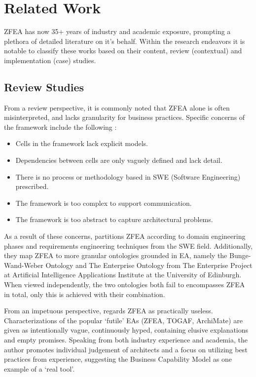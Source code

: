 \documentclass[12pt,conference]{IEEEtran}
\begin{document}
\section{Related Work}
ZFEA has now 35+ years of industry and academic exposure, prompting a plethora of detailed literature on it's behalf. 
Within the research endeavors it is notable to classify these works based on their content, review (contextual) and implementation (case) studies. 

\subsection{Review Studies}
From a review perspective, it is commonly noted that ZFEA alone is often misinterpreted, and lacks granularity for business practices. 
Specific concerns of the framework include the following \cite{rediscovering_zachman,fake_and_real_tools}:
\begin{itemize}
    \item Cells in the framework lack explicit models.
    \item Dependencies between cells are only vaguely defined and lack detail.
    \item There is no process or methodology based in SWE (Software Engineering) prescribed.
    \item The framework is too complex to support communication.
    \item The framework is too abstract to capture architectural problems.
\end{itemize}

As a result of these concerns, \cite{rediscovering_zachman} partitions ZFEA according to domain engineering phases and requirements engineering techniques from the SWE field.
Additionally, they map ZFEA to more granular ontologies grounded in EA, namely the Bunge-Wand-Weber Ontology and The Enterprise Ontology from The Enterprise Project at Artificial Intelligence Applications Institute at the University of Edinburgh.
When viewed independently, the two ontologies both fail to encompasses ZFEA in total, only this is achieved with their combination.

From an impetuous perspective, \cite{fake_and_real_tools} regards ZFEA as practically useless. 
Characterizations of the popular `futile' EAs (ZFEA, TOGAF, ArchiMate) are given as intentionally vague, continuously hyped, containing elusive explanations and empty promises. 
Speaking from both industry experience and academia, the author promotes individual judgement of architects and a focus on utilizing best practices from experience, suggesting the Business Capability Model as one example of a `real tool'. 
\end{document}
